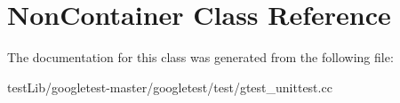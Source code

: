 \hypertarget{classNonContainer}{}\section{Non\+Container Class Reference}
\label{classNonContainer}


The documentation for this class was generated from the following file\+:\begin{DoxyCompactItemize}
\item 
test\+Lib/googletest-\/master/googletest/test/gtest\+\_\+unittest.\+cc\end{DoxyCompactItemize}
